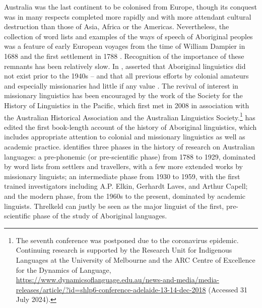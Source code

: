 Australia was the last continent to be colonised from Europe, though its conquest was in many respects completed more rapidly and with more attendant cultural destruction than those of Asia, Africa or the Americas. Nevertheless, the collection of word lists and examples of the ways of speech of Aboriginal peoples was a feature of early European voyages from the time of William Dampier in 1688 \citep[2]{mcgregor_missionary_2008} and the first settlement in 1788 \citep{troy_sydney_1992}. Recognition of the importance of these remnants has been relatively slow. In \citeyear{dixon_languages_1980}, \citeauthor{dixon_languages_1980} asserted that Aboriginal linguistics did not exist prior to the 1940s -- and that all previous efforts by colonial amateurs and especially missionaries had little if any value \citep{dixon_languages_1980}. The revival of interest in missionary linguistics has been encouraged by the work of the Society for the History of Linguistics in the Pacific, which first met in 2008 in association with the Australian Historical Association and the Australian Linguistics Society.\footnote{The seventh conference was postponed due to the coronavirus epidemic. Continuing research is supported by the Research Unit for Indigenous Languages at the University of Melbourne and the ARC Centre of Excellence for the Dynamics of Language, \url{https://www.dynamicsoflanguage.edu.au/news-and-media/media-releases/article/?id=shlp6-conference-adelaide-13-14-dec-2018} (Accessed 31 July 2024).}
\citet{mcgregor_notitle_2008} has edited the first book-length account of the history of Aboriginal linguistics, which includes appropriate attention to colonial and missionary linguistics as well as academic practice. \citet[9]{mcgregor_missionary_2008} identifies three phases in the history of research on Australian languages: a pre-phonemic (or pre-scientific phase) from 1788 to 1929, dominated by word lists from settlers and travellers, with a few more extended works by missionary linguists; an intermediate phase from 1930 to 1959, with the first trained investigators including A.P. Elkin, Gerhardt Laves, and Arthur Capell; and the modern phase, from the 1960s to the present, dominated by academic linguists. Threlkeld can justly be seen as the major linguist of the first, pre-scientific phase of the study of Aboriginal languages.

